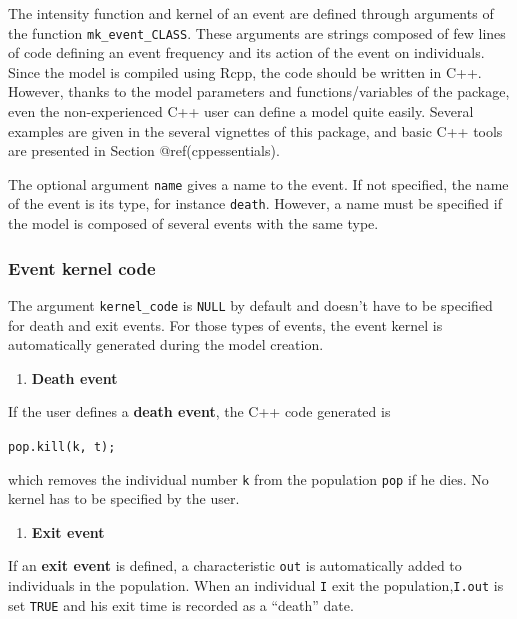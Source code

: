 The intensity function and kernel of an event are defined through arguments of the function \texttt{mk\_event\_CLASS}. These arguments are strings composed of few lines of code defining an event frequency and its action of the event on individuals. Since the model is compiled using Rcpp, the code should be written in C++. However, thanks to the model parameters and functions/variables of the package, even the non-experienced C++ user can define a model quite easily. Several examples are given in the several vignettes of this package, and basic C++ tools are presented in Section @ref(cppessentials).

The optional argument \texttt{name} gives a name to the event. If not specified, the name of the event is its type, for instance \texttt{death}. However, a name must be specified if the model is composed of several events with the same type.

\hypertarget{event-kernel-code}{%
\subsubsection{Event kernel code}\label{event-kernel-code}}

The argument \texttt{kernel\_code} is \texttt{NULL} by default and doesn't have to be specified for death and exit events. For those types of events, the event kernel is automatically generated during the model creation.

\begin{enumerate}
\def\labelenumi{\arabic{enumi}.}
\tightlist
\item
  \textbf{Death event}
\end{enumerate}

If the user defines a \textbf{death event}, the C++ code generated is

\texttt{pop.kill(k,\ t);}

which removes the individual number \texttt{k} from the population \texttt{pop} if he dies. No kernel has to be specified by the user.

\begin{enumerate}
\def\labelenumi{\arabic{enumi}.}
\setcounter{enumi}{1}
\tightlist
\item
  \textbf{Exit event}
\end{enumerate}

If an \textbf{exit event} is defined, a characteristic \texttt{out} is automatically added to individuals in the population. When an individual \texttt{I} exit the population,\texttt{I.out} is set \texttt{TRUE} and his exit time is recorded as a ``death'' date.

